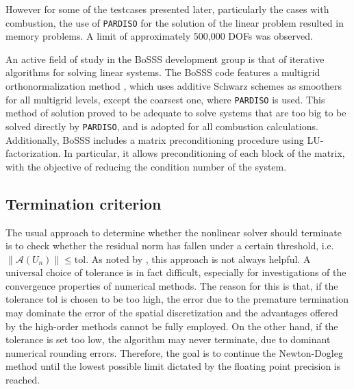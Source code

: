 However for some of the testcases presented later, particularly the cases with combustion, the use of \texttt{PARDISO} for the solution of the linear problem resulted in memory problems. A limit of approximately 500,000 DOFs was observed. 

An active field of study in the BoSSS development group is that of iterative algorithms for solving linear systems. The BoSSS code features a multigrid orthonormalization method \parencite{kummerBoSSSPackageMultigrid2021}, which uses additive Schwarz schemes as smoothers for all multigrid levels, except the coarsest one, where \texttt{PARDISO} is used. This method of solution proved to be adequate to solve systems that are too big to be solved directly by \texttt{PARDISO}, and is adopted for all combustion calculations.
Additionally, BoSSS includes a matrix preconditioning procedure using LU-factorization. In particular, it allows preconditioning of each block of the matrix, with the objective of reducing the condition number of the system.

\subsection{Termination criterion} \label{ssec:TerminationCriterion}
The usual approach to determine whether the nonlinear solver should terminate is to check whether the residual norm has fallen under a certain threshold, i.e.
$ \| \mathcal{A}(U_n) \| \leq \textrm{tol}  $. As noted by \textcite{pawlowskiInexactNewtonDogleg2008}, this approach is not always helpful. A universal choice of tolerance is in fact difficult, especially for investigations of the convergence properties of numerical methods. 
The reason for this is that, if the tolerance $\textrm{tol}$ is chosen to be too high, the error due to the premature termination may dominate the error of the spatial discretization and the advantages offered by the high-order methods cannot be fully employed. On the other hand, if the tolerance is set too low, the algorithm may never terminate, due to dominant numerical rounding errors.  Therefore, the goal is to continue the Newton-Dogleg method until the lowest possible limit dictated by the floating point precision is reached. 

